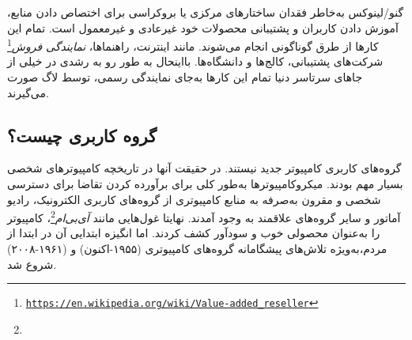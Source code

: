 گنو/لینوکس به‌خاطر فقدان ساختار‌های مرکزی یا بروکراسی برای اختصاص دادن منابع،
آموزش دادن کاربران و پشتیبانی محصولات خود غیرعادی و غیرمعمول است. تمام این کارها
از طرق گوناگونی انجام می‌شوند. مانند اینترنت، راهنماها،
\emph{نمایندگی فروش}\footnote{\texttt{\url{https://en.wikipedia.org/wiki/Value-added_reseller}}}
شرکت‌های پشتیبانی، کالج‌ها و دانشگاه‌ها. بااینحال به طور رو به رشدی در خیلی از جاهای
سرتاسر دنیا تمام این کارها به‌جای نمایندگی رسمی، توسط لاگ صورت می‌گیرند.

\subsection{گروه کاربری چیست؟}

گروه‌های کاربری کامپیوتر جدید نیستند. در حقیقت آنها در تاریخچه کامپیوترهای شخصی
بسیار مهم بودند. میکروکامپیوتر‌ها به‌طور کلی برای برآورده کردن تقاضا برای دسترسی شخصی
و مقرون به‌صرفه به منابع کامپیوتری از گروه‌های کاربری الکترونیک، رادیو آماتور و سایر گروه‌های
علاقمند به وجود آمدند. نهایتا غول‌هایی مانند
\emph{آی‌بی‌ام}\footnote{}،
کامپیوتر را به‌عنوان محصولی خوب و سودآور
کشف کردند. اما انگیزه ابتدایی آن در ابتدا از مردم،‌به‌ویژه تلاش‌های پیشگامانه
گروه‌های کامپیوتری  (۱۹۵۵-اکنون) و  (۱۹۶۱-۲۰۰۸) شروع شد.

